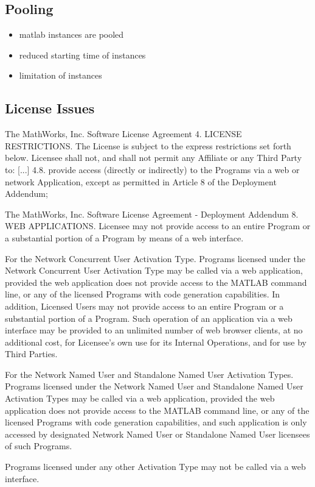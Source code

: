 	\subsection{Pooling}
	\begin{itemize}
		\item matlab instances are pooled
		\item reduced starting time of instances
		\item limitation of instances
	\end{itemize}
	\subsection{License Issues}

		\begin{signedquote}{The MathWorks, Inc. Software License Agreement}
			4. LICENSE RESTRICTIONS.  The License is subject to the express restrictions
			set forth below. Licensee shall not, and shall not permit any Affiliate or any
			Third Party to:
				[...]
			    4.8. provide access (directly or indirectly) to the Programs via a web or
			    network Application, except as permitted in Article 8 of the Deployment
			    Addendum;
		\end{signedquote}

		\begin{signedquote}{The MathWorks, Inc. Software License Agreement - Deployment Addendum}
			8. WEB APPLICATIONS.  Licensee may not provide access to an entire Program
			or a substantial portion of a Program by means of a web interface.

			For the Network Concurrent User Activation Type.  Programs licensed under the
			Network Concurrent User Activation Type may be called via a web application,
			provided the web application does not provide access to the MATLAB command
			line, or any of the licensed Programs with code generation capabilities.  In
			addition, Licensed Users may not provide access to an entire Program or a
			substantial portion of a Program.  Such operation of an application via a web
			interface may be provided to an unlimited number of web browser clients, at no
			additional cost, for Licensee's own use for its Internal Operations, and for
			use by Third Parties.

			For the Network Named User and Standalone Named User Activation Types.
			Programs licensed under the Network Named User and Standalone Named User
			Activation Types may be called via a web application, provided the web
			application does not provide access to the MATLAB command line, or any of the
			licensed Programs with code generation capabilities, and such application is
			only accessed by designated Network Named User or Standalone Named User
			licensees of such Programs.

			Programs licensed under any other Activation Type may not be called via a web
			interface.
		\end{signedquote}

